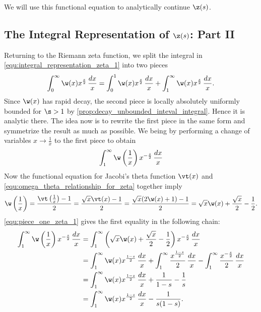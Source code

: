       We will use this functional equation to analytically continue $\z(s)$.
    \subsection*{The Integral Representation of \texorpdfstring{$\z(s)$}{\z(s)}: Part II}
      Returning to the Riemann zeta function, we split the integral in \cref{equ:integral_representation_zeta_1} into two pieces
      \begin{equation}\label{equ:symmetric_integral_zeta_split}
        \int_{0}^{\infty}\w(x)x^{\frac{s}{2}}\,\frac{dx}{x} = \int_{0}^{1}\w(x)x^{\frac{s}{2}}\,\frac{dx}{x}+\int_{1}^{\infty}\w(x)x^{\frac{s}{2}}\,\frac{dx}{x}.
      \end{equation}
      Since $\w(x)$ has rapid decay, the second piece is locally absolutely uniformly bounded for $\s > 1$ by \cref{prop:decay_unbounded_inteval_integral}. Hence it is analytic there. The idea now is to rewrite the first piece in the same form and symmetrize the result as much as possible. We being by performing a change of variables $x \to \frac{1}{x}$ to the first piece to obtain
      \[
        \int_{1}^{\infty}\w\left(\frac{1}{x}\right)x^{-\frac{s}{2}}\,\frac{dx}{x}
      \]
      Now the functional equation for Jacobi's theta function $\vt(x)$ and \cref{equ:omega_theta_relationship_for_zeta} together imply
      \begin{equation}\label{equ:piece_one_zeta_1}
        \w\left(\frac{1}{x}\right) = \frac{\vt\left(\frac{1}{x}\right)-1}{2} = \frac{\sqrt{x}\vt(x)-1}{2} = \frac{\sqrt{x}(2\w(x)+1)-1}{2} = \sqrt{x}\w(x)+\frac{\sqrt{x}}{2}-\frac{1}{2}.
      \end{equation}
      \cref{equ:piece_one_zeta_1} gives the first equality in the following chain:
      \begin{align*}
        \int_{1}^{\infty}\w\left(\frac{1}{x}\right)x^{-\frac{s}{2}}\,\frac{dx}{x} &= \int_{1}^{\infty}\left(\sqrt{x}\w(x)+\frac{\sqrt{x}}{2}-\frac{1}{2}\right)x^{-\frac{s}{2}}\,\frac{dx}{x} \\
        &= \int_{1}^{\infty}\w(x)x^{\frac{1-s}{2}}\,\frac{dx}{x}+\int_{1}^{\infty}\frac{x^{\frac{1-s}{2}}}{2}\,\frac{dx}{x}-\int_{1}^{\infty}\frac{x^{-\frac{s}{2}}}{2}\,\frac{dx}{x} \\
        &= \int_{1}^{\infty}\w(x)x^{\frac{1-s}{2}}\,\frac{dx}{x}+\frac{1}{1-s}-\frac{1}{s} \\
        &= \int_{1}^{\infty}\w(x)x^{\frac{1-s}{2}}\,\frac{dx}{x}-\frac{1}{s(1-s)}.
      \end{align*}
